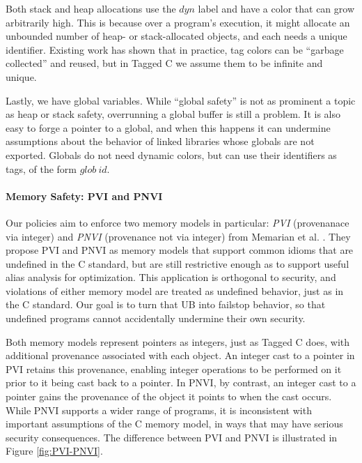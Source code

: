 \documentclass[acmsmall,review,anonymous]{acmart}\settopmatter{printfolios=true,printccs=false,printacmref=false}
\begin{document}
Both stack and heap allocations use the \(\mathit{dyn}\) label and have a color that can grow arbitrarily
high. This is because over a program's execution, it might allocate an unbounded number of heap- or
stack-allocated objects, and each needs a unique identifier. Existing work has shown that in practice,
tag colors can be ``garbage collected'' and reused, but in Tagged C we assume them to be infinite and unique.

Lastly, we have global variables. While ``global safety'' is not as prominent a topic as heap or
stack safety, overrunning a global buffer is still a problem. It is also easy to forge a pointer to a global,
and when this happens it can undermine assumptions about the behavior of linked libraries whose globals
are not exported. Globals do not need dynamic colors, but can use their identifiers as tags, of the form
\(\mathit{glob} ~ id\).

\paragraph{Memory Safety: PVI and PNVI}

Our policies aim to enforce two memory models in particular: {\it PVI} (provenanace via integer) and
{\it PNVI} (provenance not via integer) from Memarian et al. \cite{???}. They propose PVI and PNVI
as memory models that support common idioms that are undefined in the C standard, but are still restrictive
enough as to support useful alias analysis for optimization. This application is orthogonal to
security, and violations of either memory model are treated as undefined behavior, just as in the
C standard. Our goal is to turn that UB into failstop behavior, so that undefined programs cannot accidentally
undermine their own security.

Both memory models represent pointers as integers, just as Tagged C does, with additional provenance
associated with each object. An integer cast to a pointer in PVI retains this provenance, enabling
integer operations to be performed on it prior to it being cast back to a pointer.
In PNVI, by contrast, an integer cast to a pointer gains the provenance of the object it points
to when the cast occurs. While PNVI supports a wider range of programs, it is inconsistent with important
assumptions of the C memory model, in ways that may have serious security consequences.
The difference between PVI and PNVI is illustrated in Figure \ref{fig:PVI-PNVI}.
\end{document}
